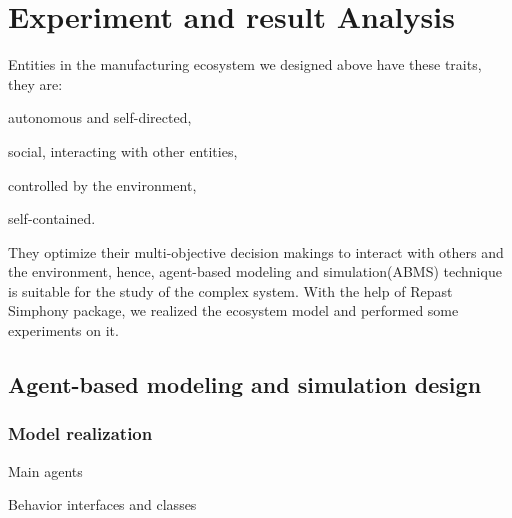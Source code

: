 \section{Experiment and result Analysis} %
\label{sec:Experiment_results}

Entities in the manufacturing ecosystem we designed above have these traits, they are: \begin{inparaenum}
\item autonomous and self-directed, 
\item social, interacting with other entities, 
\item controlled by the environment, 
\item self-contained.
\end{inparaenum} They optimize their multi-objective decision makings to interact with others and the environment, hence, agent-based modeling and simulation(ABMS) technique\cite{Macal2009,north2007managing} is suitable for the study of the complex system. With the help of Repast Simphony\cite{North2013} package, we realized the ecosystem model and performed some experiments on it.
\subsection{Agent-based modeling and simulation design} %
\label{sub:agent_based_modeling_and_simulation}
\subsubsection{Model realization}
\begin{asparaenum}
\item Main agents
%     
%     
%     
%     
%     
%     
%     
%     
% 
% 	


\item Behavior interfaces and classes
\end{asparaenum}


